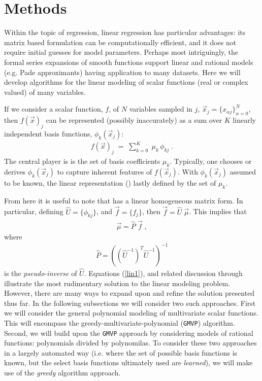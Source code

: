 \documentclass[twocolumn,aps,prd,floatfix,preprintnumbers,a4paper,nofootinbib,
superscriptaddress,10pt]{revtex4-1}
\def\gmvp#1{greedy-multivariate-polynomial#1
  (\texttt{GMVP}#1)\gdef\gmvp{\texttt{GMVP}}}
\begin{document}
\section{Methods}
\label{meth}
%
Within the topic of regression, linear regression has particular advantages:
%
its matrix based formulation can be computationally efficient, and it does not require initial guesses for model parameters.
%
Perhaps most intriguingly, the formal series expansions of smooth functions support linear and rational models (e.g. Pade approximants) having application to many datasets.
%
Here we will develop algorithms for the linear modeling of scalar functions (real or complex valued) of many variables.
%
\par If we consider a scalar function, $f$, of $N$ variables sampled in $j$, $\vec{x}_j = \{x_{\alpha j}\}_{\alpha=0}^{N}$, then $f(\vec{x})_j$ can be represented (possibly inaccurately) as a sum over $K$ linearly independent basis functions, $\phi_k(\vec{x}_j)$:
%
\begin{align}
  \label{lin1}
  f({\vec{x}})_j \; = \; \sum_{k=0}^{K} \; \mu_{k} \, \phi_{kj}\; .
\end{align}
%
The central player is  is the set of basis coefficients $\mu_{k}$.
%
Typically, one chooses or derives $\phi_{k}(\vec{x}_j)$ to capture inherent features of $f(\vec{x}_j)$.
%
With $\phi_{k}(\vec{x}_j)$ assumed to be known, the linear representation () lastly defined by the set of $\mu_k$.
%
\def\vecmu{\vec{\mu}}
\def\vecf{\vec{f}}
\def\hatU{\hat{U}}
\def\hatP{\hat{P}}
%
\par From here it is useful to note that  has a linear homogeneous matrix form. In particular, defining $\hat{U} = \{\phi_{kj}\}$, and $\vec{f} = \{f_j\}$, then $\vec{f} = \hat{U} \; \vec{\mu}$.
%
This implies that
%
\begin{align}
  \vecmu = \hatP \; \vecf \; ,
\end{align}
%
where
%
\begin{align}
  \label{pinv1}
  \hatP = \left( \left( \hatU^{-1} \right)^T \hatU^{-1} \right)^{-1}
\end{align}
%
is the \textit{pseudo-inverse} of $\hatU$.
%
Equations (\ref{lin1}), and related discussion through  illustrate the most rudimentary solution to the linear modeling problem.
%
However, there are many ways to expand upon and refine the solution presented thus far.
%
In the following subsections we will consider two such approaches.
%
First we will consider the general polynomial modeling of multivariate scalar functions.
%
This will encompass the \gmvp{} algorithm.
%
Second, we will build upon the \gmvp{} approach by considering models of rational functions: polynomials divided by polynomilas.
%
To consider these two approaches in a largely automated way (i.e. where the set of possible basis functions is known, but the select basis functions ultimately used are \textit{learned}), we will make use of the \textit{greedy} algorithm approach.
%
\end{document}
